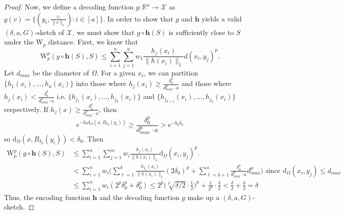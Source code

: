 \documentclass[12pt]{article}
\newcommand{\R}{\mathbb R}
\begin{document}
\begin{proof}
    Now, we define a decoding function $g: \R^a \to \mathcal{X}$ as $g(v) = \{(y_i, \frac{v_i}{\|v\|_1}): i \in [a]\}$. In order to show that $g$ and $\mathbf{h}$ yields a valid $(\delta, a, G)$-sketch of $\mathcal{X}$, we must show that $g \circ \mathbf{h}(S)$ is sufficiently close to $S$ under the $\mathrm{W}_p$ distance. First, we know that
    \begin{equation*}
        \mathrm{W}_p^p(g \circ \mathbf{h}(S), S) \leq \sum_{i = 1}^n \sum_{j = 1}^a w_1 \frac{h_j(x_i)}{\|h(x_i)\|_1} d(x_i, y_j)^p.
    \end{equation*}
    Let $d_{max}$ be the diameter of $\Omega$. For a given $x_i$, we can partition $\{h_1(x_i), \dots, h_a(x_i)\}$ into those where $h_j(x_i) \geq \frac{\delta_0^p}{d_{max}^p \cdot a}$ and those where $h_j(x_i) < \frac{\delta_0^p}{d_{max}^p \cdot a}$ i.e. $\{h_{j_1}(x_i), \dots, h_{j_k}(x_i)\}$ and $\{h_{j_{k + 1}}(x_i), \dots, h_{j_a}(x_i)\}$ respectively. If $h_j(x) \geq \frac{\delta_0^p}{d_{max}^p \cdot a}$, then 
    \begin{equation*}
        e^{-b_0 \mathrm{d}_\Omega(x, B_{\delta_0}(y_i))} \geq \frac{\delta_0^p}{d_{max}^p \cdot a} > e^{-b_0 \delta_0}
    \end{equation*}
    so $\mathrm{d}_{\Omega}(x, B_{\delta_0}(y_i)) < \delta_0$. Then 
    \begin{align*}
        \mathrm{W}_p^p(g \circ \mathbf{h}(S), S) &\leq \sum_{i = 1}^n \sum_{j = 1}^m w_i \frac{h_j(x_i)}{\|h(x_i)\|_1} \mathrm{d}_\Omega(x_i, y_j)^p.\\
        &< \sum_{i = 1}^n w_i \Big( \sum_{\ell = 1}^k \frac{h_{j_\ell}(x_i)}{\|h(x_i)\|_1}(2\delta_0)^p + \sum_{\ell = k + 1}^{a} \frac{\delta_0^p}{d_{max}^p \cdot a} d_{max}^p \Big) \text{ since } \mathrm{d}_\Omega(x_i, y_j) \leq d_{max} \\
        &\leq \sum_{i = 1}^n w_i(2^p\delta_0^p + \delta_0^p) \leq 2^p \Big(\sqrt[p]{\delta/2} \cdot \frac{1}{2}\Big)^p + \frac{1}{2^p} \cdot \frac{\delta}{2} < \frac{\delta}{2} + \frac{\delta}{2} = \delta
    \end{align*}
    Thus, the encoding function $\mathbf{h}$ and the decoding function $g$ make up a $(\delta, a, G)$-sketch. 
\end{proof}
\end{document}
